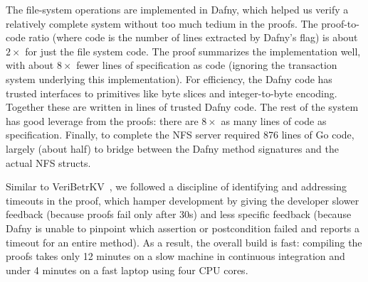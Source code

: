 

The file-system operations are implemented in Dafny, which helped us verify a
relatively complete system without too much tedium in the proofs. The
proof-to-code ratio (where code is the number of lines extracted by Dafny's
 flag) is about $2\times$ for just the file system code.
The proof summarizes the implementation well, with about $8\times$ fewer lines
of specification as code (ignoring the transaction system underlying this
implementation). For efficiency, the Dafny code has trusted interfaces to
primitives like byte slices and integer-to-byte encoding. Together these are
written in  lines of trusted Dafny code. The rest of the system has
good leverage from the proofs: there are $8\times$ as many lines of code as
specification. Finally, to complete the NFS server required 876 lines of Go
code, largely (about half) to bridge between the Dafny method signatures and the
actual NFS structs.


\begin{comment}
begin
    rm -rf src-compiled
    for file in src/*/**.dfy
        set -l path (string sub --start 4 $file)
        set -l dir (dirname $path)
        mkdir -p src-compiled/$dir
        dafny /printMode:NoGhost /dafnyVerify:0 /rprint:src-compiled/$path $file &
    end
    wait
    cloc --read-lang-def ~/dafny-lang.txt src-compiled
    cloc --read-lang-def ~/dafny-lang.txt src
end
\end{comment}



\begin{comment}
begin
    gsed -n '/method[^(]* [A-Z]*(/,/^\s*{/p' src/fs/dir_fs.dfy
    cat src/fs/nfs.s.dfy
end | wc -l
\end{comment}
%


Similar to VeriBetrKV~\cite{hance:veribetrkv}, we followed a
discipline of identifying and addressing timeouts in the proof, which
hamper development by giving the developer slower feedback (because
proofs fail only after 30s) and less specific feedback (because Dafny
is unable to pinpoint which assertion or postcondition failed and
reports a timeout for an entire method).  As a result, the overall
build is fast: compiling the proofs takes only 12 minutes on a slow
machine in continuous integration and under 4 minutes on a fast laptop
using four CPU cores.

